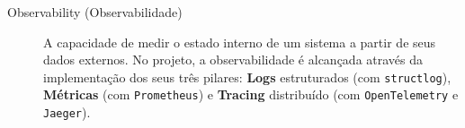 \begin{description}
    \item[Observability (Observabilidade)] A capacidade de medir o estado interno de um sistema a partir de seus dados externos. No projeto, a observabilidade é alcançada através da implementação dos seus três pilares: \textbf{Logs} estruturados (com \texttt{structlog}), \textbf{Métricas} (com \texttt{Prometheus}) e \textbf{Tracing} distribuído (com \texttt{OpenTelemetry} e \texttt{Jaeger}).

\end{description}
